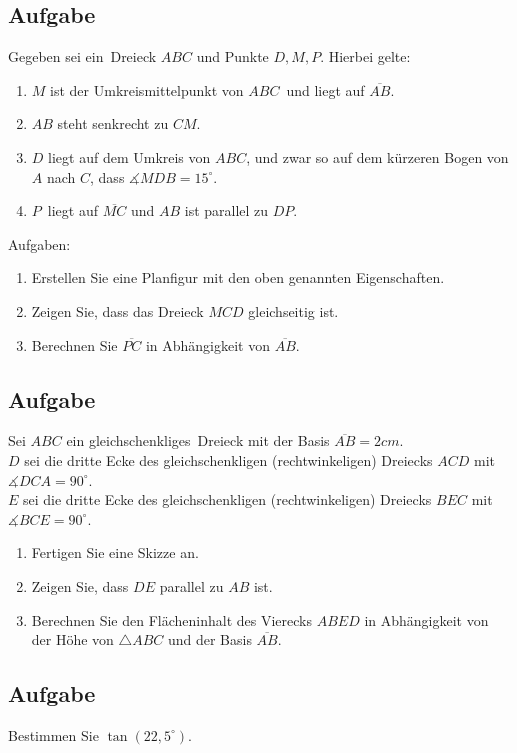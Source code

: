 \documentclass[a4paper,10pt]{article}
\begin{document}
\subsection{Aufgabe}
Gegeben sei ein Dreieck $ABC$ und Punkte $D,M,P$. Hierbei gelte:
\begin{enumerate}
\item $M$ ist der Umkreismittelpunkt von $ABC$ und liegt auf $\overline{AB}$.
\item $AB$ steht senkrecht zu $CM$.
\item $D$ liegt auf dem Umkreis von $ABC$, und zwar so auf dem kürzeren Bogen von $A$ nach $C$, dass $\measuredangle MDB=15^\circ$.
\item $P$ liegt auf $\overline{MC}$ und $AB$ ist parallel zu $DP$.
\end{enumerate}
Aufgaben:
\begin{enumerate}[label=\alph*)]
\item Erstellen Sie eine Planfigur mit den oben genannten Eigenschaften.
\item Zeigen Sie, dass das Dreieck $MCD$ gleichseitig ist.
\item Berechnen Sie $\overline{PC}$ in Abhängigkeit von $\overline{AB}$.
\end{enumerate}

\subsection{Aufgabe}
Sei $ABC$ ein gleichschenkliges Dreieck mit der Basis $\overline{AB} = 2cm$.\\
$D$ sei die dritte Ecke des gleichschenkligen (rechtwinkeligen) Dreiecks $ACD$ mit $\measuredangle DCA=90^\circ$.\\
$E$ sei die dritte Ecke des gleichschenkligen (rechtwinkeligen) Dreiecks $BEC$ mit $\measuredangle BCE=90^\circ$.
\begin{enumerate}[label=\alph*)]
\item Fertigen Sie eine Skizze an.
\item Zeigen Sie, dass $DE$ parallel zu $AB$ ist.
\item Berechnen Sie den Flächeninhalt des Vierecks $ABED$ in Abhängigkeit von der Höhe von $\triangle ABC$ und der Basis $\overline{AB}$.
\end{enumerate}

\subsection{Aufgabe}
Bestimmen Sie $\tan(22,5^\circ)$.
\end{document}
